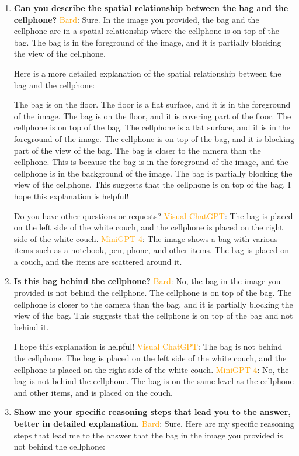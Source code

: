 \begin{enumerate}
    \item \textbf{Can you describe the spatial relationship between the bag and the cellphone?}
    \subitem \textcolor{orange}{Bard}: Sure. In the image you provided, the bag and the cellphone are in a spatial relationship where the cellphone is on top of the bag. The bag is in the foreground of the image, and it is partially blocking the view of the cellphone.

    Here is a more detailed explanation of the spatial relationship between the bag and the cellphone:
    
    The bag is on the floor. The floor is a flat surface, and it is in the foreground of the image. The bag is on the floor, and it is covering part of the floor.
    The cellphone is on top of the bag. The cellphone is a flat surface, and it is in the foreground of the image. The cellphone is on top of the bag, and it is blocking part of the view of the bag.
    The bag is closer to the camera than the cellphone. This is because the bag is in the foreground of the image, and the cellphone is in the background of the image.
    The bag is partially blocking the view of the cellphone. This suggests that the cellphone is on top of the bag.
    I hope this explanation is helpful!
    
    Do you have other questions or requests?
    \subitem \textcolor{orange}{Visual ChatGPT}: The bag is placed on the left side of the white couch, and the cellphone is placed on the right side of the white couch.
    \subitem \textcolor{orange}{MiniGPT-4}: The image shows a bag with various items such as a notebook, pen, phone, and other items. The bag is placed on a couch, and the items are scattered around it.
    \item \textbf{Is this bag behind the cellphone?}
    \subitem \textcolor{orange}{Bard}: No, the bag in the image you provided is not behind the cellphone. The cellphone is on top of the bag. The cellphone is closer to the camera than the bag, and it is partially blocking the view of the bag. This suggests that the cellphone is on top of the bag and not behind it.

    I hope this explanation is helpful!
    \subitem \textcolor{orange}{Visual ChatGPT}: The bag is not behind the cellphone. The bag is placed on the left side of the white couch, and the cellphone is placed on the right side of the white couch.
    \subitem \textcolor{orange}{MiniGPT-4}: No, the bag is not behind the cellphone. The bag is on the same level as the cellphone and other items, and is placed on the couch.
    \item \textbf{Show me your specific reasoning steps that lead you to the answer, better in detailed explanation.}
    \subitem \textcolor{orange}{Bard}: 
    Sure. Here are my specific reasoning steps that lead me to the answer that the bag in the image you provided is not behind the cellphone:
    

\end{enumerate}
